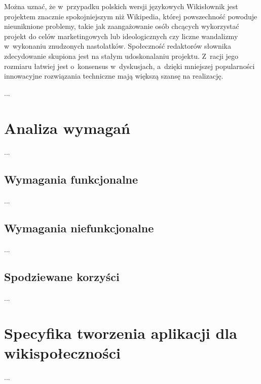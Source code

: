 Można uznać, że w~przypadku polskich wersji językowych Wikisłownik jest projektem znacznie spokojniejszym niż Wikipedia, której powszechność powoduje nieuniknione problemy, takie jak zaangażowanie osób chcących wykorzystać projekt do celów marketingowych lub ideologicznych czy liczne wandalizmy w~wykonaniu znudzonych nastolatków. Społeczność redaktorów słownika zdecydowanie skupiona jest na stałym udoskonalaniu projektu. Z~racji jego rozmiaru łatwiej jest o~konsensus w~dyskusjach, a~dzięki mniejszej popularności innowacyjne rozwiązania techniczne mają większą szansę na realizację.

...


\section{Analiza wymagań}
...
\subsection{Wymagania funkcjonalne}
...
\subsection{Wymagania niefunkcjonalne}
...
\subsection{Spodziewane korzyści}
...

\section{Specyfika tworzenia aplikacji dla wikispołeczności}
...
